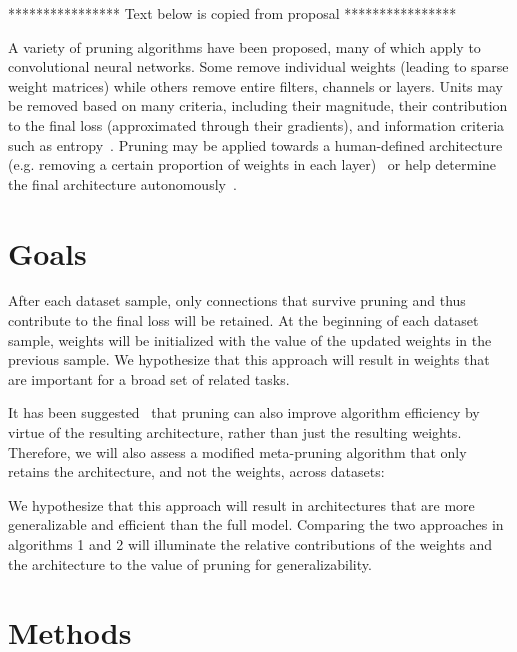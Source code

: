\documentclass{article}
\begin{document}
**************** Text below is copied from proposal ****************

A variety of pruning algorithms have been proposed, many of which apply to convolutional neural networks. Some remove individual weights (leading to sparse weight matrices) while others remove entire filters, channels or layers. Units may be removed based on many criteria, including their magnitude, their contribution to the final loss (approximated through their gradients), and information criteria such as entropy~\citet{NIPS_learning_weights_pruning, prune_transfer_learning, prune_entropy, prune_slimming}.  Pruning may be applied towards a human-defined architecture (e.g. removing a certain proportion of weights in each layer)~\citet{prune_nisp} or help determine the final architecture autonomously~\citet{prune_thinet}. 

\section{Goals}





After each dataset sample, only connections that survive pruning and thus contribute to the final loss will be retained.  At the beginning of each dataset sample, weights will be initialized with the value of the updated weights in the previous sample. We hypothesize that this approach will result in weights that are important for a broad set of related tasks. 

It has been suggested~\citet{prune_for_architecture} that pruning can also improve algorithm efficiency by virtue of the resulting architecture, rather than just the resulting weights. Therefore, we will also assess a modified meta-pruning algorithm that only retains the architecture, and not the weights, across datasets:



We hypothesize that this approach will result in architectures that are more generalizable and efficient than the full model. Comparing the two approaches in algorithms 1 and 2 will illuminate the relative contributions of the weights and the architecture to the value of pruning for generalizability. 

\section{Methods}
\end{document}

